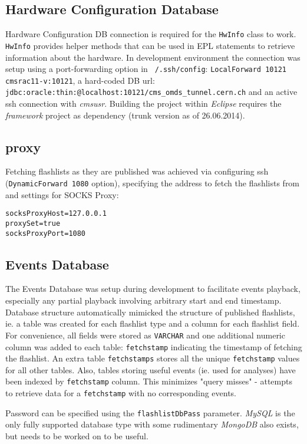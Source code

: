 \subsection{Hardware Configuration Database}
\label{subsec:hwconfdb}
Hardware Configuration DB connection is required for the \texttt{HwInfo} class to work. \texttt{HwInfo} provides helper methods that can be used in EPL statements to retrieve information about the hardware.
In development environment the connection was setup using a port-forwarding option in \texttt{~/.ssh/config}: \texttt{LocalForward 10121 cmsrac11-v:10121}, a hard-coded DB url: \texttt{jdbc:oracle:thin:@localhost:10121/cms\_omds\_tunnel.cern.ch} and an active ssh connection with \emph{cmsusr}. Building the project within \emph{Eclipse} requires the \emph{framework} project as dependency (trunk version as of 26.06.2014).

\subsection{proxy}
\label{subsec:proxy}
Fetching flashlists as they are published was achieved via configuring ssh (\texttt{DynamicForward 1080} option), specifying the address to fetch the flashlists from and settings for SOCKS Proxy:
\begin{lstlisting}
socksProxyHost=127.0.0.1
proxySet=true
socksProxyPort=1080
\end{lstlisting}

\subsection{Events Database}
\label{subsec:eventsdb}
The Events Database was setup during development to facilitate events playback, especially any partial playback involving arbitrary start and end timestamp.
Database structure automatically mimicked the structure of published flashlists, ie. a table was created for each flashlist type and a column for each flashlist field. 
For convenience, all fields were stored as \texttt{VARCHAR} and one additional numeric column was added to each table: \texttt{fetchstamp} indicating the timestamp of fetching the flashlist. An extra table \texttt{fetchstamps} stores all the unique \texttt{fetchstamp} values for all other tables. Also, tables storing useful events (ie. used for analyses) have been indexed by \texttt{fetchstamp} column. This minimizes "query misses" - attempts to retrieve data for a \texttt{fetchstamp} with no corresponding events.

Password can be specified using the \texttt{flashlistDbPass} parameter. \emph{MySQL} is the only fully supported database type with some rudimentary \emph{MongoDB} also exists, but needs to be worked on to be useful.






